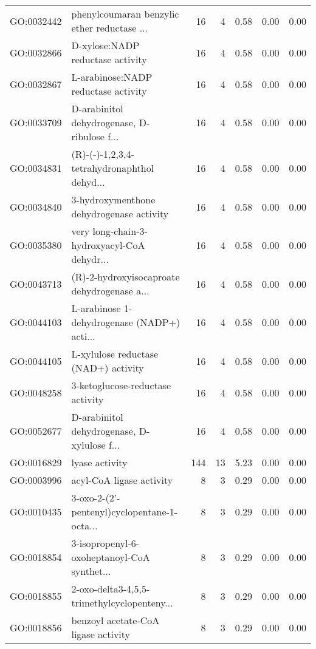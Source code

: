 \begin{table}[ht]
\begin{tabular}{llrrrrr}
  GO:0032442 & phenylcoumaran benzylic ether reductase ... &  16 &   4 & 0.58 & 0.00 & 0.00 \\ 
  GO:0032866 & D-xylose:NADP reductase activity &  16 &   4 & 0.58 & 0.00 & 0.00 \\ 
  GO:0032867 & L-arabinose:NADP reductase activity &  16 &   4 & 0.58 & 0.00 & 0.00 \\ 
  GO:0033709 & D-arabinitol dehydrogenase, D-ribulose f... &  16 &   4 & 0.58 & 0.00 & 0.00 \\ 
  GO:0034831 & (R)-(-)-1,2,3,4-tetrahydronaphthol dehyd... &  16 &   4 & 0.58 & 0.00 & 0.00 \\ 
  GO:0034840 & 3-hydroxymenthone dehydrogenase activity &  16 &   4 & 0.58 & 0.00 & 0.00 \\ 
  GO:0035380 & very long-chain-3-hydroxyacyl-CoA dehydr... &  16 &   4 & 0.58 & 0.00 & 0.00 \\ 
  GO:0043713 & (R)-2-hydroxyisocaproate dehydrogenase a... &  16 &   4 & 0.58 & 0.00 & 0.00 \\ 
  GO:0044103 & L-arabinose 1-dehydrogenase (NADP+) acti... &  16 &   4 & 0.58 & 0.00 & 0.00 \\ 
  GO:0044105 & L-xylulose reductase (NAD+) activity &  16 &   4 & 0.58 & 0.00 & 0.00 \\ 
  GO:0048258 & 3-ketoglucose-reductase activity &  16 &   4 & 0.58 & 0.00 & 0.00 \\ 
  GO:0052677 & D-arabinitol dehydrogenase, D-xylulose f... &  16 &   4 & 0.58 & 0.00 & 0.00 \\ 
  GO:0016829 & lyase activity & 144 &  13 & 5.23 & 0.00 & 0.00 \\ 
  GO:0003996 & acyl-CoA ligase activity &   8 &   3 & 0.29 & 0.00 & 0.00 \\ 
  GO:0010435 & 3-oxo-2-(2'-pentenyl)cyclopentane-1-octa... &   8 &   3 & 0.29 & 0.00 & 0.00 \\ 
  GO:0018854 & 3-isopropenyl-6-oxoheptanoyl-CoA synthet... &   8 &   3 & 0.29 & 0.00 & 0.00 \\ 
  GO:0018855 & 2-oxo-delta3-4,5,5-trimethylcyclopenteny... &   8 &   3 & 0.29 & 0.00 & 0.00 \\ 
  GO:0018856 & benzoyl acetate-CoA ligase activity &   8 &   3 & 0.29 & 0.00 & 0.00 \\ 
   \hline
\end{tabular}
\end{table}
